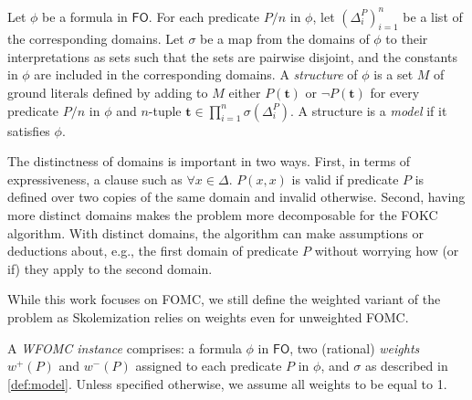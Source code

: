 \documentclass[a4paper,UKenglish,cleveref, autoref, thm-restate]{lipics-v2021}
\newcommand{\FO}{$\mathsf{FO}$}
\begin{document}
\begin{definition}[Model]\label{def:model}
  Let $\phi$ be a formula in \FO{}. For each predicate $P/n$ in $\phi$, let
  ${(\Delta_{i}^{P})}_{i=1}^{n}$ be a list of the corresponding domains. Let
  $\sigma$ be a map from the domains of $\phi$ to their interpretations as sets
  such that the sets are pairwise disjoint, and the constants in $\phi$ are
  included in the corresponding domains. A \emph{structure} of $\phi$ is a set
  $M$ of ground literals defined by adding to $M$ either $P(\mathbf{t})$ or
  $\neg P(\mathbf{t})$ for every predicate $P/n$ in $\phi$ and $n$-tuple
  $\mathbf{t} \in \prod_{i=1}^{n} \sigma(\Delta_{i}^{P})$. A structure is a
  \emph{model} if it satisfies $\phi$.
\end{definition}


\begin{remark*}
  The distinctness of domains is important in two ways. First, in terms of
  expressiveness, a clause such as $\forall x \in \Delta\text{. }P(x, x)$ is
  valid if predicate $P$ is defined over two copies of the same domain and
  invalid otherwise. Second, having more distinct domains makes the problem more
  decomposable for the FOKC algorithm. With distinct domains, the algorithm can
  make assumptions or deductions about, e.g., the first domain of predicate $P$
  without worrying how (or if) they apply to the second domain.
\end{remark*}

While this work focuses on FOMC, we still define the weighted variant of the
problem as Skolemization relies on weights even for unweighted FOMC.

\begin{definition}\label{def:instance}
  A \emph{WFOMC instance} comprises: a formula $\phi$ in \FO{}, two (rational)
  \emph{weights} $w^{+}(P)$ and $w^{-}(P)$ assigned to each predicate $P$ in
  $\phi$, and $\sigma$ as described in \cref{def:model}. Unless specified
  otherwise, we assume all weights to be equal to 1.
\end{definition}
\end{document}
